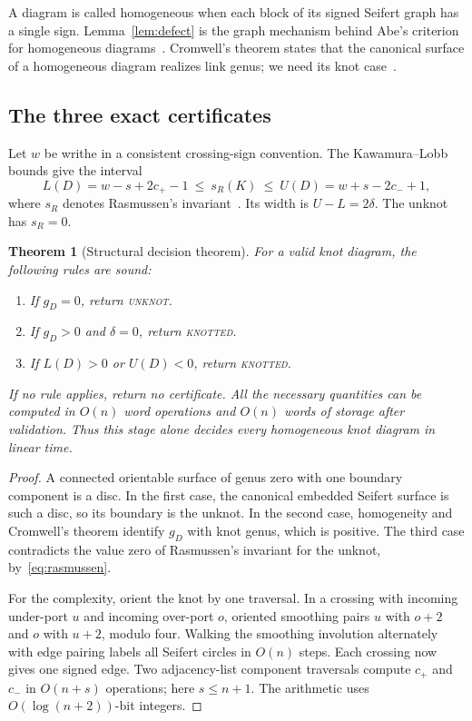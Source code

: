 \documentclass[11pt,letterpaper]{article}
\newtheorem{theorem}{Theorem}[section]
\newcommand{\UNKNOT}{\textup{\textsc{unknot}}}
\newcommand{\KNOTTED}{\textup{\textsc{knotted}}}
\begin{document}
A diagram is called homogeneous when each block of its signed Seifert graph
has a single sign. Lemma~\ref{lem:defect} is the graph mechanism behind
Abe's criterion for homogeneous diagrams~\cite{abe}. Cromwell's theorem
states that the canonical surface of a homogeneous diagram realizes link
genus; we need its knot case~\cite{cromwell,manchon}.

\subsection{The three exact certificates}
Let $w$ be writhe in a consistent crossing-sign convention. The
Kawamura--Lobb bounds give the interval
\begin{equation}\label{eq:rasmussen}
 L(D)=w-s+2c_+-1\ \le\ s_R(K)\ \le\
 U(D)=w+s-2c_-+1,
\end{equation}
where $s_R$ denotes Rasmussen's invariant~\cite[Theorem 1.10]{lobb}.
Its width is $U-L=2\delta$. The unknot has $s_R=0$.

\begin{theorem}[Structural decision theorem]\label{thm:structural}
For a valid knot diagram, the following rules are sound:
\begin{enumerate}
\item If $g_D=0$, return \UNKNOT.
\item If $g_D>0$ and $\delta=0$, return \KNOTTED.
\item If $L(D)>0$ or $U(D)<0$, return \KNOTTED.
\end{enumerate}
If no rule applies, return no certificate. All the necessary quantities can
be computed in $O(n)$ word operations and $O(n)$ words of storage after
validation. Thus this stage alone decides every homogeneous knot diagram in
linear time.
\end{theorem}
\begin{proof}
A connected orientable surface of genus zero with one boundary component is
a disc. In the first case, the canonical embedded Seifert surface is such a
disc, so its boundary is the unknot. In the second case, homogeneity and
Cromwell's theorem identify $g_D$ with knot genus, which is positive. The
third case contradicts the value zero of Rasmussen's invariant for the
unknot, by~\eqref{eq:rasmussen}.

For the complexity, orient the knot by one traversal. In a crossing with
incoming under-port $u$ and incoming over-port $o$, oriented smoothing pairs
$u$ with $o+2$ and $o$ with $u+2$, modulo four. Walking the smoothing
involution alternately with edge pairing labels all Seifert circles in
$O(n)$ steps. Each crossing now gives one signed edge. Two adjacency-list
component traversals compute $c_+$ and $c_-$ in $O(n+s)$ operations; here
$s\le n+1$. The arithmetic uses $O(\log(n+2))$-bit integers.
\end{proof}
\end{document}
